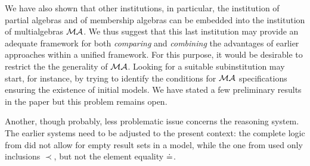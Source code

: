 \documentclass[10pt]{article}
\begin{document}
We have also shown that other institutions, in particular, the institution of
partial algebras and of membership algebras can be embedded into the
institution of multialgebras ${\mathcal{MA}}$. We thus suggest that this last institution may
provide an adequate framework for both {\em comparing} and {\em combining} the advantages
of earlier approaches within a unified framework.
For this purpose, it would be desirable to restrict the 
the generality of ${\mathcal{MA}}$. Looking for a suitable subinstitution may
start, for instance, by trying to identify the conditions for ${\mathcal{MA}}$
specifications ensuring the existence of initial models. We have stated a few
preliminary results in the paper but this problem remains open.

Another, though probably, less problematic issue concerns the reasoning
system. The earlier systems need to be adjusted to the present context: the
complete logic from \cite{toplas,calc} did not allow for empty result sets in a model,
while the one from \cite{BK} used only inclusions $\prec$, but not the element
equality $\mathrel{\dot{=} }$.





\end{document}
